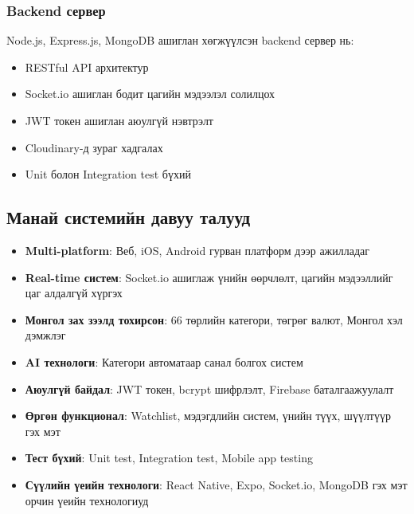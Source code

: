 \subsubsection{Backend сервер}
Node.js, Express.js, MongoDB ашиглан хөгжүүлсэн backend сервер нь:
\begin{itemize}
    \item RESTful API архитектур
    \item Socket.io ашиглан бодит цагийн мэдээлэл солилцох
    \item JWT токен ашиглан аюулгүй нэвтрэлт
    \item Cloudinary-д зураг хадгалах
    \item Unit болон Integration test бүхий
\end{itemize}

\subsection{Манай системийн давуу талууд}
\begin{itemize}
    \item \textbf{Multi-platform}: Веб, iOS, Android гурван платформ дээр ажилладаг
    \item \textbf{Real-time систем}: Socket.io ашиглаж үнийн өөрчлөлт, цагийн мэдээллийг цаг алдалгүй хүргэх
    \item \textbf{Монгол зах зээлд тохирсон}: 66 төрлийн категори, төгрөг валют, Монгол хэл дэмжлэг
    \item \textbf{AI технологи}: Категори автоматаар санал болгох систем
    \item \textbf{Аюулгүй байдал}: JWT токен, bcrypt шифрлэлт, Firebase баталгаажуулалт
    \item \textbf{Өргөн функционал}: Watchlist, мэдэгдлийн систем, үнийн түүх, шүүлтүүр гэх мэт
    \item \textbf{Тест бүхий}: Unit test, Integration test, Mobile app testing
    \item \textbf{Сүүлийн үеийн технологи}: React Native, Expo, Socket.io, MongoDB гэх мэт орчин үеийн технологиуд
\end{itemize}

